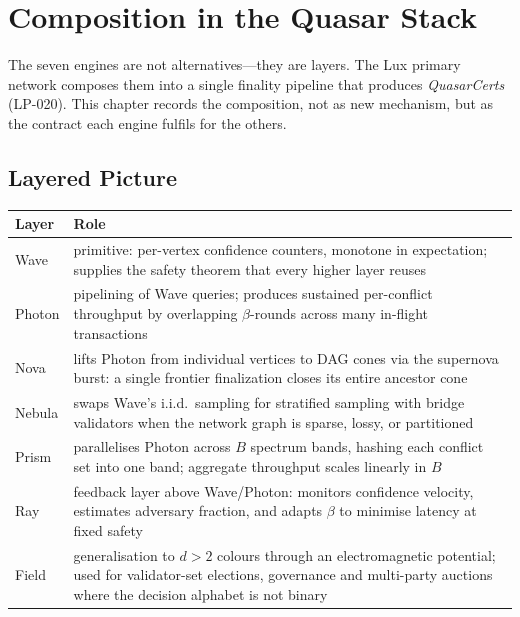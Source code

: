 \chapter{Composition in the Quasar Stack}
\label{ch:composition}

The seven engines are not alternatives---they are layers. The Lux primary
network composes them into a single finality pipeline that produces
\emph{QuasarCerts} (LP-020). This chapter records the composition,
not as new mechanism, but as the contract each engine fulfils for the
others.

\section{Layered Picture}

\begin{center}
\begin{tabular}{p{2.6cm}p{11cm}}
\toprule
\textbf{Layer} & \textbf{Role}\\
\midrule
Wave   & primitive: per-vertex confidence counters, monotone in expectation;
         supplies the safety theorem that every higher layer reuses\\
Photon & pipelining of Wave queries; produces sustained per-conflict
         throughput by overlapping $\beta$-rounds across many in-flight
         transactions\\
Nova   & lifts Photon from individual vertices to DAG cones via the
         supernova burst: a single frontier finalization closes its
         entire ancestor cone\\
Nebula & swaps Wave's i.i.d.\ sampling for stratified sampling with
         bridge validators when the network graph is sparse, lossy, or
         partitioned\\
Prism  & parallelises Photon across $B$ spectrum bands, hashing each
         conflict set into one band; aggregate throughput scales linearly
         in $B$\\
Ray    & feedback layer above Wave/Photon: monitors confidence velocity,
         estimates adversary fraction, and adapts $\beta$ to minimise
         latency at fixed safety\\
Field  & generalisation to $d > 2$ colours through an electromagnetic
         potential; used for validator-set elections, governance and
         multi-party auctions where the decision alphabet is not binary\\
\bottomrule
\end{tabular}
\end{center}

